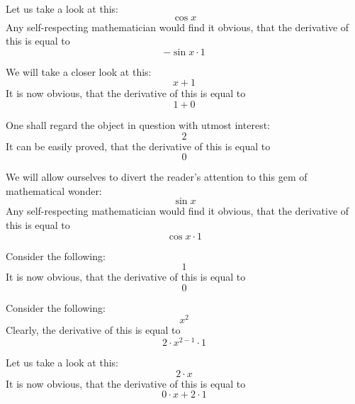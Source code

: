 \documentclass{article}
\begin{document}
Let us take a look at this:
\begin{equation}
\cos x 
\end{equation}
Any self-respecting mathematician would find it obvious, that the derivative of this is equal to
\begin{equation}
-\sin x \cdot 1 
\end{equation}

We will take a closer look at this:
\begin{equation}
x + 1 
\end{equation}
It is now obvious, that the derivative of this is equal to
\begin{equation}
1 + 0 
\end{equation}

One shall regard the object in question with utmost interest:
\begin{equation}
2 
\end{equation}
It can be easily proved, that the derivative of this is equal to
\begin{equation}
0 
\end{equation}

We will allow ourselves to divert the reader's attention to this gem of mathematical wonder:
\begin{equation}
\sin x 
\end{equation}
Any self-respecting mathematician would find it obvious, that the derivative of this is equal to
\begin{equation}
\cos x \cdot 1 
\end{equation}

Consider the following:
\begin{equation}
1 
\end{equation}
It is now obvious, that the derivative of this is equal to
\begin{equation}
0 
\end{equation}

Consider the following:
\begin{equation}
x ^{2 } 
\end{equation}
Clearly, the derivative of this is equal to
\begin{equation}
2 \cdot x ^{2 - 1 } \cdot 1 
\end{equation}

Let us take a look at this:
\begin{equation}
2 \cdot x 
\end{equation}
It is now obvious, that the derivative of this is equal to
\begin{equation}
0 \cdot x + 2 \cdot 1 
\end{equation}
\end{document}
